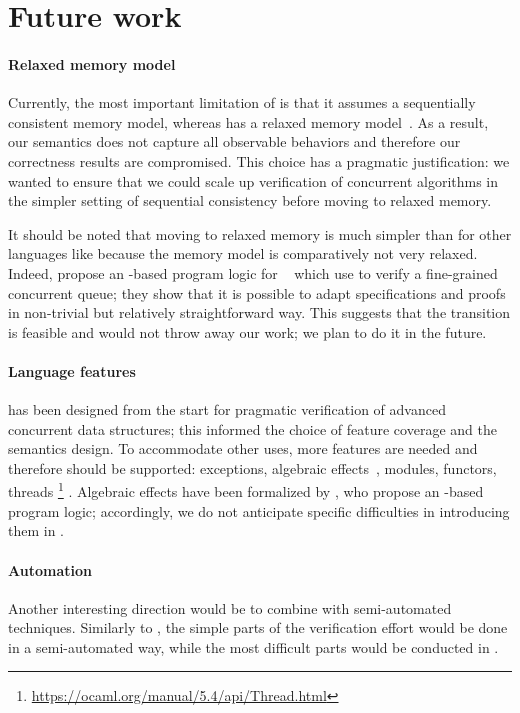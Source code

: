 \section{Future work}

\paragraph{Relaxed memory model}

Currently, the most important limitation of \ZooLang is that it assumes a sequentially consistent memory model, whereas \OCamlFive has a relaxed memory model~\citep*{DBLP:conf/pldi/DolanSM18}.
As a result, our semantics does not capture all observable behaviors and therefore our correctness results are compromised.
This choice has a pragmatic justification: we wanted to ensure that we could scale up verification of concurrent algorithms in the simpler setting of sequential consistency before moving to relaxed memory.

It should be noted that moving to relaxed memory is much simpler than for other languages like \C because the \OCamlFive memory model is comparatively not very relaxed.
Indeed, \citet*{DBLP:journals/pacmpl/MevelJP20} propose an \Iris-based program logic for \MulticoreOCaml~\citep*{DBLP:journals/pacmpl/Sivaramakrishnan20} which \citet*{DBLP:journals/pacmpl/MevelJ21} use to verify a fine-grained concurrent queue; they show that it is possible to adapt specifications and proofs in non-trivial but relatively straightforward way.
This suggests that the transition is feasible and would not throw away our work; we plan to do it in the future.

\paragraph{Language features}

\ZooLang has been designed from the start for pragmatic verification of advanced concurrent data structures; this informed the choice of feature coverage and the semantics design.
To accommodate other uses, more features are needed and therefore should be supported: exceptions, algebraic effects~\citep*{DBLP:conf/pldi/Sivaramakrishnan21}, modules, functors, threads%
\footnote{
\url{https://ocaml.org/manual/5.4/api/Thread.html}
}%
.
Algebraic effects have been formalized by \citet*{DBLP:journals/pacmpl/VilhenaP21}, who propose an \Iris-based program logic; accordingly, we do not anticipate specific difficulties in introducing them in \ZooLang.

\paragraph{Automation}

Another interesting direction would be to combine \Zoo with semi-automated techniques.
Similarly to \WhyThree, the simple parts of the verification effort would be done in a semi-automated way, while the most difficult parts would be conducted in \Rocq.
